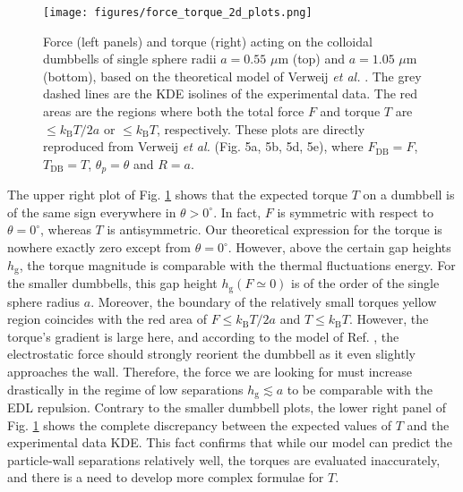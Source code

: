 \documentclass{master_thesis}
\begin{document}
\begin{figure}[ht]
    \centering
    \texttt{[image: figures/force\_torque\_2d\_plots.png]}
    \caption{Force (left panels) and torque (right) acting on the colloidal dumbbells of single sphere radii $a=0.55$ $\mu$m (top) and $a=1.05$ $\mu$m (bottom), based on the theoretical model of Verweij \textit{et al.} \cite{verweij2021}. The grey dashed lines are the KDE isolines of the experimental data. The red areas are the regions where both the total force $F$ and torque $T$ are $\leq k_{\textrm{B}}T/2a$ or $\leq k_{\textrm{B}}T$, respectively. These plots are directly reproduced from Verweij \textit{et al.} \cite{verweij2021} (Fig. 5a, 5b, 5d, 5e), where $F_{\textrm{DB}} = F$, $T_{\textrm{DB}} = T$, $\theta_p = \theta$ and $R=a$.}
    \label{fig:force_torque_distributions}
\end{figure}

The upper right plot of Fig. \ref{fig:force_torque_distributions} shows that the expected torque $T$ on a dumbbell is of the same sign everywhere in $\theta>0^{\circ}$. In fact, $F$ is symmetric with respect to $\theta=0^{\circ}$, whereas $T$ is antisymmetric. Our theoretical expression for the torque is nowhere exactly zero except from $\theta=0^{\circ}$. However, above the certain gap heights $h_{\textrm{g}}$, the torque magnitude is comparable with the thermal fluctuations energy. For the smaller dumbbells, this gap height $h_{\textrm{g}}(F\simeq 0)$ is of the order of the single sphere radius $a$. Moreover, the boundary of the relatively small torques yellow region coincides with the red area of $F \leqslant k_{\textrm{B}}T / 2a$ and $T \leqslant k_{\textrm{B}}T$. However, the torque's gradient is large here, and according to the model of Ref. \cite{verweij2021}, the electrostatic force should strongly reorient the dumbbell as it even slightly approaches the wall. Therefore, the force we are looking for must increase drastically in the regime of low separations $h_{\textrm{g}}\lesssim a$ to be comparable with the EDL repulsion. Contrary to the smaller dumbbell plots, the lower right panel of Fig. \ref{fig:force_torque_distributions} shows the complete discrepancy between the expected values of $T$ and the experimental data KDE. This fact confirms that while our model can predict the particle-wall separations relatively well, the torques are evaluated inaccurately, and there is a need to develop more complex formulae for $T$.
\end{document}
